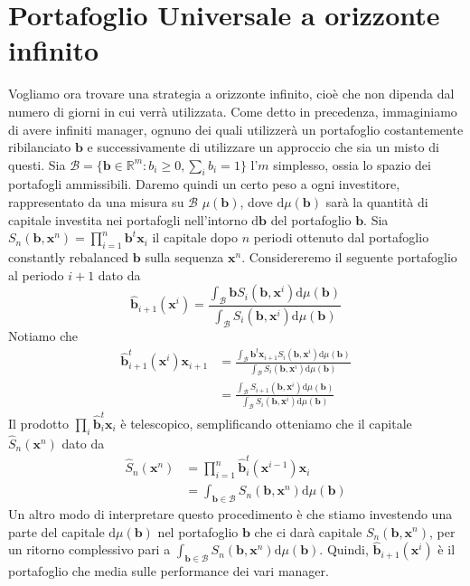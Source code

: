 \documentclass[a4paper,11pt]{book}
\theoremstyle{plain}
\theoremstyle{definition}
\theoremstyle{remark}
\newcommand{\R}{\mathbb{R}}
\newcommand{\x}{\bm{x}}
\newcommand{\B}{\bm{b}}
\newcommand{\bh}{\hat{\bm{b}}}
\newcommand{\Sh}{\hat{S}}
\newcommand{\dmu}{\text{d}\mu(\B)}
\begin{document}
\section{Portafoglio Universale a orizzonte infinito}\label{univinfinite}
Vogliamo ora trovare una strategia a orizzonte infinito, cioè che non dipenda dal numero di giorni in cui verrà utilizzata. Come detto in precedenza, immaginiamo di avere infiniti manager, ognuno dei quali utilizzerà un portafoglio costantemente ribilanciato $\B$ e successivamente di utilizzare un approccio che sia un misto di questi.\newline
Sia $\mathcal{B}=\{\B\in\R^m:b_i\geq 0,\sum_i{b_i}=1\}$ l'$m$ simplesso, ossia lo spazio dei portafogli ammissibili.
Daremo quindi un certo peso a ogni investitore, rappresentato da una misura su $\mathcal{B}$ $\mu(\B)$, dove $\dmu$ sarà la quantità di capitale investita nei portafogli nell'intorno $\text{d}\B$ del portafoglio $\B$.\newline
Sia $S_n(\B,\x^n)=\prod_{i = 1}^n {\B^t\x_i}$ il capitale dopo $n$ periodi ottenuto dal portafoglio constantly rebalanced $\B$ sulla sequenza $\x^n$. Considereremo il seguente portafoglio al periodo $i+1$ dato da 
\begin{equation}\label{portafuniv}
	\bh_{i+1}(\x^i)=\frac{\int_\mathcal{B}{\B S_i(\B,\x^i)\dmu}}{\int_\mathcal{B}{S_i(\B,\x^i)\dmu}}
\end{equation}
Notiamo che
\begin{equation*}
	\begin{split}
	\bh_{i+1}^t(\x^i)\x_{i+1} & = \frac{\int_\mathcal{B}{\B^t\x_{i+1} S_i(\B,\x^i)\dmu}}{\int_\mathcal{B}{S_i(\B,\x^i)\dmu}}\\
	& = \frac{\int_\mathcal{B}{S_{i+1}(\B,\x^i)\dmu}}{\int_\mathcal{B}{S_i(\B,\x^i)\dmu}}
	\end{split}
\end{equation*}
Il prodotto $\prod_{i}{\bh^t_i\x_i}$ è telescopico, semplificando otteniamo che il capitale $\Sh_n(\x^n)$ dato da
\begin{equation}\label{capituniv}
	\begin{split}
	\Sh_n(\x^n) & = \prod_{i = 1}^n{\bh^t_i(\x^{i-1})\x_i}\\
	& = \int_{\B \in \mathcal{B}}{S_n(\B,\x^n)\dmu}
	\end{split}
\end{equation}
Un altro modo di interpretare questo procedimento è che stiamo investendo una parte del capitale $\dmu$ nel portafoglio $\B$ che ci darà capitale $S_n(\B,\x^n)$, per un ritorno complessivo pari a $\int_{\B \in \mathcal{B}}{S_n(\B,\x^n)\dmu}$. Quindi, $\bh_{i+1}(\x^i)$ è il portafoglio che media sulle performance dei vari manager.\newline
\end{document}
